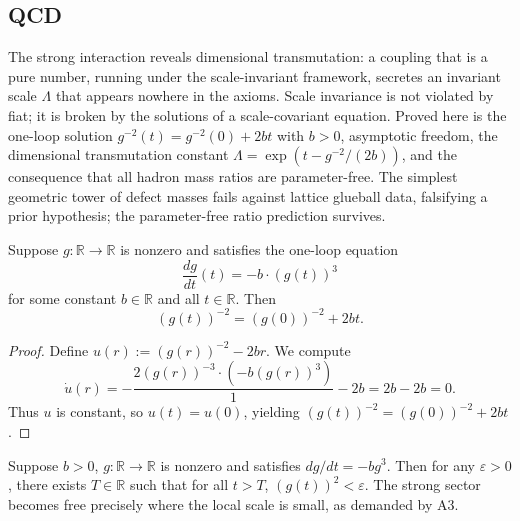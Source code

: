 \subsection{QCD}

The strong interaction reveals dimensional transmutation: a coupling that is a pure number, running under the scale-invariant framework, secretes an invariant scale $\Lambda$ that appears nowhere in the axioms. Scale invariance is not violated by fiat; it is broken by the solutions of a scale-covariant equation. Proved here is the one-loop solution $g^{-2}(t) = g^{-2}(0) + 2bt$ with $b > 0$, asymptotic freedom, the dimensional transmutation constant $\Lambda = \exp(t - g^{-2}/(2b))$, and the consequence that all hadron mass ratios are parameter-free. The simplest geometric tower of defect masses fails against lattice glueball data, falsifying a prior hypothesis; the parameter-free ratio prediction survives.

\begin{theorem}
Suppose $g : \mathbb{R} \to \mathbb{R}$ is nonzero and satisfies the one-loop equation
\begin{equation}
\frac{dg}{dt}(t) = -b \cdot (g(t))^3
\end{equation}
for some constant $b \in \mathbb{R}$ and all $t \in \mathbb{R}$. Then
\begin{equation}
(g(t))^{-2} = (g(0))^{-2} + 2bt .
\end{equation}
\end{theorem}

\begin{proof}
Define $u(r) := (g(r))^{-2} - 2br$. We compute
\begin{equation}
\dot{u}(r) = -\frac{2(g(r))^{-3} \cdot (-b(g(r))^3)}{1} - 2b = 2b - 2b = 0 .
\end{equation}
Thus $u$ is constant, so $u(t) = u(0)$, yielding $(g(t))^{-2} = (g(0))^{-2} + 2bt$.
\end{proof}

\begin{theorem}
Suppose $b > 0$, $g : \mathbb{R} \to \mathbb{R}$ is nonzero and satisfies $dg/dt = -b g^3$. Then for any $\varepsilon > 0$, there exists $T \in \mathbb{R}$ such that for all $t > T$, $(g(t))^2 < \varepsilon$. The strong sector becomes free precisely where the local scale is small, as demanded by A3.
\end{theorem}

